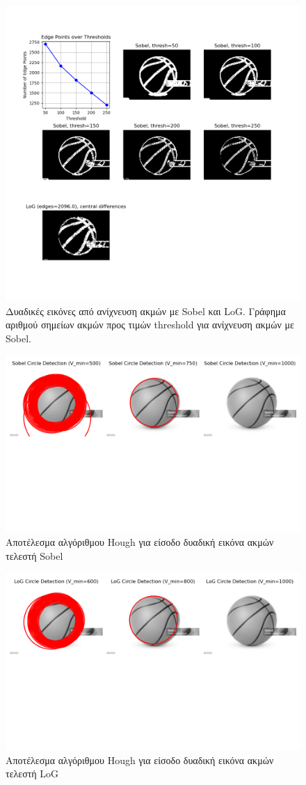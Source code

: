 \documentclass{article}
\begin{document}
\begin{figure}
    \includegraphics[width=\textwidth]{log_n_sobel.png}
    \caption{Δυαδικές εικόνες από ανίχνευση ακμών με Sobel και LoG. Γράφημα αριθμού
    σημείων ακμών προς τιμών threshold για ανίχνευση ακμών με Sobel.}\label{lognsobel}
\end{figure}

\begin{figure}
    \includegraphics[width=\textwidth]{sobel_circle.png}
    \caption{Αποτέλεσμα αλγόριθμου Hough για είσοδο δυαδική εικόνα ακμών τελεστή Sobel}\label{sobel_hough}
\end{figure}

\begin{figure}
    \includegraphics[width=\textwidth]{log_circle.png}
    \caption{Αποτέλεσμα αλγόριθμου Hough για είσοδο δυαδική εικόνα ακμών τελεστή LoG}\label{log_hough}
\end{figure}
\end{document}
